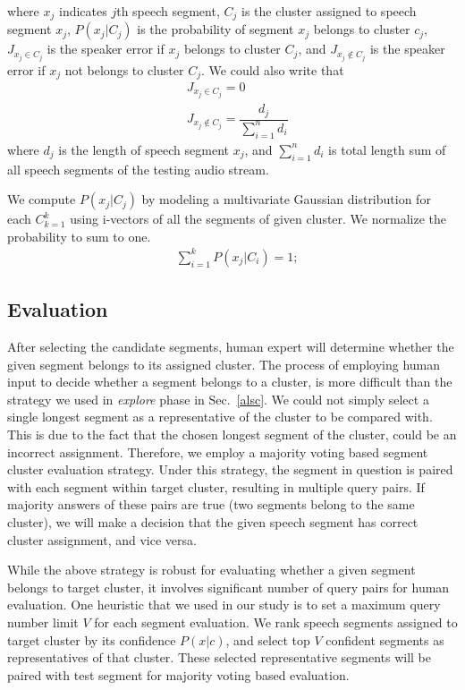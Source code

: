 \documentclass[journal,10pt]{IEEEtran}
\begin{document}
where $x_j$ indicates $j$th speech segment, $C_j$ is the cluster assigned to speech segment $x_j$, $P(x_j|C_j)$ is the probability of segment $x_j$ belongs to cluster $c_j$, $J_{x_j \in C_j} $ is the speaker error if $x_j$ belongs to cluster $C_j$, and $J_{x_j \notin C_j}$ is the speaker error if $x_j$ not belongs to cluster $C_j$. We could also write that
\begin{equation}
\begin{aligned}
&J_{x_j \in C_j} = 0 \\
&J_{x_j \notin C_j} = \dfrac{d_j}{\sum_{i=1}^{n} d_i}
\label{jj}
\end{aligned}
\end{equation} 
where $d_j$ is the length of speech segment $x_j$, and $\sum_{i=1}^{n} d_i$ is total length sum of all speech segments of the testing audio stream.

We compute $P(x_j|C_j)$ by modeling a multivariate Gaussian distribution for each $C_{k=1}^{k}$ using i-vectors of all the segments of given cluster. We normalize the probability to sum to one.
\begin{equation}
\begin{aligned}
&  \sum_{i=1}^{k} P(x_j|C_i) = 1;
\label{jj}
\end{aligned}
\end{equation}
 
\subsection{Evaluation}
After selecting the candidate segments, human expert will determine whether the given segment belongs to its assigned cluster. The process of employing human input to decide whether a segment belongs to a cluster, is more difficult than the strategy we used in \textit{explore} phase in Sec.~\ref{alsc}. We could not simply select a single longest segment as a representative of the cluster to be compared with. This is due to the fact that the chosen longest segment of the cluster, could be an incorrect assignment. Therefore, we employ a majority voting based segment cluster evaluation strategy. Under this strategy, the segment in question is paired with each segment within target cluster, resulting in multiple query pairs. If majority answers of these pairs are true (two segments belong to the same cluster), we will make a decision that the given speech segment has correct cluster assignment, and vice versa. 

While the above strategy is robust for evaluating whether a given segment belongs to target cluster, it involves significant number of query pairs for human evaluation. One heuristic that we used in our study is to set a maximum query number limit $V$ for each segment evaluation. We rank speech segments assigned to target cluster by its confidence $P(x|c)$, and select top $V$ confident segments as representatives of that cluster. These selected representative segments will be paired with test segment for majority voting based evaluation. 
\end{document}
